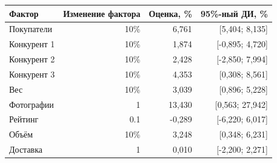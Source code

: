 \begin{tabular}{lrrr}
\toprule
Фактор & Изменение фактора & Оценка, \% & 95\%-ный ДИ, \% \\
\midrule
Покупатели & 10\% & 6,761 & [5,404; 8,135] \\
Конкурент 1 & 10\% & 1,874 & [-0,895; 4,720] \\
Конкурент 2 & 10\% & 2,428 & [-2,850; 7,994] \\
Конкурент 3 & 10\% & 4,353 & [0,308; 8,561] \\
Вес & 10\% & 3,039 & [0,896; 5,228] \\
Фотографии & 1 & 13,430 & [0,563; 27,942] \\
Рейтинг & 0.1 & -0,289 & [-6,220; 6,017] \\
Объём & 10\% & 3,248 & [0,348; 6,231] \\
Доставка & 1 & 0,010 & [-2,200; 2,271] \\
\bottomrule
\end{tabular}
